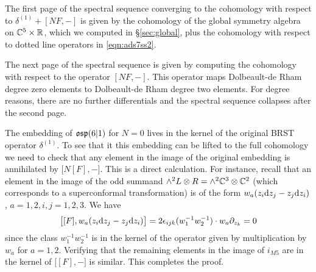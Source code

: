 The first page of the spectral sequence converging to the cohomology with respect to $\delta^{(1)} + [N F, -]$ is given by the cohomology of the global symmetry algebra on $\mathbb C^5 \times \mathbb R$, which we computed in \S \ref{sec:global}, plus the cohomology with respect to dotted line operators in \eqref{eqn:ads7ss2}. 

The next page of the spectral sequence is given by computing the cohomology with respect to the operator $[N F,-]$. 
This operator maps Dolbeault-de Rham degree zero elements to Dolbeault-de Rham degree two elements. 
For degree reasons, there are no further differentials and the spectral sequence collapses after the second page. 

The embedding of $\mathfrak{osp}(6|1)$ for $N=0$ lives in the kernel of the original BRST operator $\delta^{(1)}$. 
To see that it this embedding can be lifted to the full cohomology we need to check that any element in the image of the original embedding is annihilated by $\big[ N [F] , - \big]$. 
This is a direct calculation. 
For instance, recall that an element in the image of the odd summand $\wedge^2 L \otimes R = \wedge^2 \mathbb C^3 \otimes \mathbb C^2$ (which corresponds to a superconformal transformation) is of the form $w_a (z_i {\rm d} z_j - z_j {\rm d} z_i)$, $a=1,2, i,j=1,2,3$. 
We have
\[
\big[[F] , w_a (z_i {\rm d} z_j - z_j {\rm d} z_i)\big] = 2 \epsilon_{ijk} (w_1^{-1} w_2^{-1}) \cdot w_a \partial_{z_k} = 0
\]
since the class $w_1^{-1} w_2^{-1}$ is in the kernel of the operator given by multiplication by $w_a$ for $a=1,2$.
Verifying that the remaining elements in the image of $i_{M5}$ are in the kernel of $\big[ [F], -\big]$ is similar.
This completes the proof.


